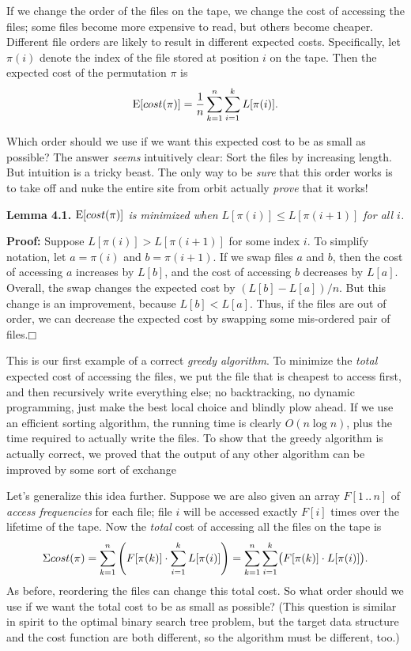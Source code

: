 If we change the order of the files on the tape, we change the cost of accessing the files; some files become more expensive to read, but others become cheaper.
Different file orders are likely to result in different expected costs.
Specifically, let $\pi(i)$ denote the index of the file stored at position $i$ on the tape.
Then the expected cost of the permutation $\pi$ is
\[
\mathrm{E}[cost(\pi)] = \frac{1}{n} \sum_{k=1}^{n} \sum_{i=1}^{k} L[\pi(i)].
\]

Which order should we use if we want this expected cost to be as small as possible?
The answer \textit{seems} intuitively clear: Sort the files by increasing length.
But intuition is a tricky beast.
The only way to be \textit{sure} that this order works is to take off and nuke the entire site from orbit actually \textit{prove} that it works!

\noindent\textbf{Lemma 4.1.} \textsl{$\mathrm{E}[cost(\pi)]$ is minimized when $L[\pi(i)] \le L[\pi(i+1)]$ for all $i$.}

\noindent\textbf{Proof:} Suppose $L[\pi(i)] > L[\pi(i+1)]$ for some index $i$.
To simplify notation, let $a = \pi(i)$ and $b = \pi(i+1)$.
If we swap files $a$ and $b$, then the cost of accessing $a$ increases by $L[b]$, and the cost of accessing $b$ decreases by $L[a]$.
Overall, the swap changes the expected cost by $(L[b] - L[a])/n$.
But this change is an improvement, because $L[b] < L[a]$.
Thus, if the files are out of order, we can decrease the expected cost by swapping some mis-ordered pair of files.\hfill$\mdlgwhtsquare$

This is our first example of a correct \textit{greedy algorithm}.
To minimize the \textit{total} expected cost of accessing the files, we put the file that is cheapest to access first, and then recursively write everything else; no backtracking, no dynamic programming, just make the best local choice and blindly plow ahead.
If we use an efficient sorting algorithm, the running time is clearly $O(n \log n)$, plus the time required to actually write the files.
To show that the greedy algorithm is actually correct, we proved that the output of any other algorithm can be improved by some sort of exchange

Let’s generalize this idea further.
Suppose we are also given an array $F[1\,..\,n]$ of \textit{access frequencies} for each file; file $i$ will be accessed exactly $F[i]$ times over the lifetime of the tape.
Now the \textit{total} cost of accessing all the files on the tape is
\[
\Sigma cost(\pi) = \sum_{k=1}^{n} \left( F[\pi(k)] \cdot \sum_{i=1}^{k} L[\pi(i)] \right) = \sum_{k=1}^{n} \sum_{i=1}^{k} \bigl( F[\pi(k)] \cdot L[\pi(i)] \bigr).
\]
As before, reordering the files can change this total cost.
So what order should we use if we want the total cost to be as small as possible?
(This question is similar in spirit to the optimal binary search tree problem, but the target data structure and the cost function are both different, so the algorithm must be different, too.)

